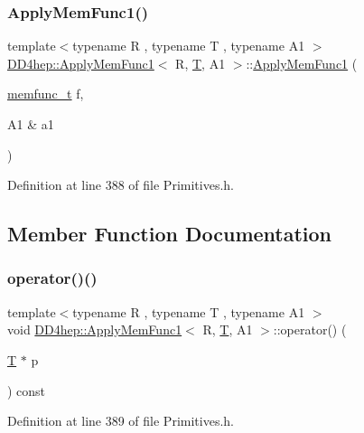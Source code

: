 \subsubsection{\texorpdfstring{Apply\+Mem\+Func1()}{ApplyMemFunc1()}}
{\footnotesize\ttfamily template$<$typename R , typename T , typename A1 $>$ \\
\hyperlink{struct_d_d4hep_1_1_apply_mem_func1}{D\+D4hep\+::\+Apply\+Mem\+Func1}$<$ R, \hyperlink{class_t}{T}, A1 $>$\+::\hyperlink{struct_d_d4hep_1_1_apply_mem_func1}{Apply\+Mem\+Func1} (\begin{DoxyParamCaption}\item[{\hyperlink{struct_d_d4hep_1_1_apply_mem_func1_a8d2f05f9fd623eebfcfa252c8102783c}{memfunc\+\_\+t}}]{f,  }\item[{A1 \&}]{a1 }\end{DoxyParamCaption})\hspace{0.3cm}{\ttfamily [inline]}}



Definition at line 388 of file Primitives.\+h.



\subsection{Member Function Documentation}
\hypertarget{struct_d_d4hep_1_1_apply_mem_func1_a3d37fd62fb489f329dffe33489bf4ef0}{}\label{struct_d_d4hep_1_1_apply_mem_func1_a3d37fd62fb489f329dffe33489bf4ef0} 
\subsubsection{\texorpdfstring{operator()()}{operator()()}}
{\footnotesize\ttfamily template$<$typename R , typename T , typename A1 $>$ \\
void \hyperlink{struct_d_d4hep_1_1_apply_mem_func1}{D\+D4hep\+::\+Apply\+Mem\+Func1}$<$ R, \hyperlink{class_t}{T}, A1 $>$\+::operator() (\begin{DoxyParamCaption}\item[{\hyperlink{class_t}{T} $\ast$}]{p }\end{DoxyParamCaption}) const\hspace{0.3cm}{\ttfamily [inline]}}



Definition at line 389 of file Primitives.\+h.



